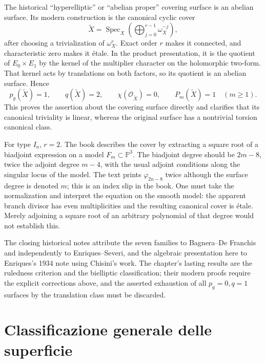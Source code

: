 The historical ``hyperelliptic'' or ``abelian proper'' covering surface is an abelian surface. Its modern construction is the canonical cyclic cover
\[
 \widetilde X=\operatorname{Spec}_X
 \left(\bigoplus_{j=0}^{r-1}\omega_X^{-j}\right),
\]
after choosing a trivialization of $\omega_X^r$. Exact order $r$ makes it connected, and characteristic zero makes it étale. In the product presentation, it is the quotient of $E_0\times E_1$ by the kernel of the multiplier character on the holomorphic two-form. That kernel acts by translations on both factors, so its quotient is an abelian surface. Hence
\[
 p_g(\widetilde X)=1,\qquad q(\widetilde X)=2,
 \qquad\chi(\mathcal O_{\widetilde X})=0,
 \qquad P_m(\widetilde X)=1\quad(m\geq1).
\]
This proves the assertion about the covering surface directly and clarifies that its canonical triviality is linear, whereas the original surface has a nontrivial torsion canonical class.

For type $I_a$, $r=2$. The book describes the cover by extracting a square root of a biadjoint expression on a model $F_m\subset\mathbb P^3$. The biadjoint degree should be $2m-8$, twice the adjoint degree $m-4$, with the usual adjoint conditions along the singular locus of the model. The text prints $\varphi_{2n-8}$ twice although the surface degree is denoted $m$; this is an index slip in the book. One must take the normalization and interpret the equation on the smooth model: the apparent branch divisor has even multiplicities and the resulting canonical cover is étale. Merely adjoining a square root of an arbitrary polynomial of that degree would not establish this.

The closing historical notes attribute the seven families to Bagnera--De Franchis and independently to Enriques--Severi, and the algebraic presentation here to Enriques's 1934 note using Chisini's work. The chapter's lasting results are the ruledness criterion and the bielliptic classification; their modern proofs require the explicit corrections above, and the asserted exhaustion of all $p_g=0,q=1$ surfaces by the translation class must be discarded.

\chapter{Classificazione generale delle superficie}
\label{cp2-ch-xi}

